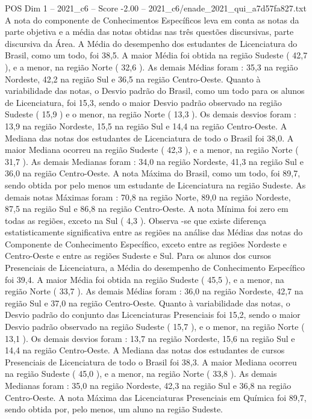 \begin{textsample}{POS Dim 1 – 2021\_c6 – Score -2.00 – 2021\_c6/enade\_2021\_qui\_a7d57fa827.txt}
A nota do componente de Conhecimentos Específicos leva em conta as notas da parte objetiva e a média das notas obtidas nas três questões discursivas, parte discursiva da Área.
A Média do desempenho dos estudantes de Licenciatura do Brasil, como um todo, foi 38,5.
A maior Média foi obtida na região Sudeste ( 42,7 ), e a menor, na região Norte ( 32,6 ).
As demais Médias foram : 35,3 na região Nordeste, 42,2 na região Sul e 36,5 na região Centro-Oeste.
Quanto à variabilidade das notas, o Desvio padrão do Brasil, como um todo para os alunos de Licenciatura, foi 15,3, sendo o maior Desvio padrão observado na região Sudeste ( 15,9 ) e o menor, na região Norte ( 13,3 ).
Os demais desvios foram : 13,9 na região Nordeste, 15,5 na região Sul e 14,4 na região Centro-Oeste.
A Mediana das notas dos estudantes de Licenciatura de todo o Brasil foi 38,0.
A maior Mediana ocorreu na região Sudeste ( 42,3 ), e a menor, na região Norte ( 31,7 ).
As demais Medianas foram : 34,0 na região Nordeste, 41,3 na região Sul e 36,0 na região Centro-Oeste.
A nota Máxima do Brasil, como um todo, foi 89,7, sendo obtida por pelo menos um estudante de Licenciatura na região Sudeste.
As demais notas Máximas foram : 70,8 na região Norte, 89,0 na região Nordeste, 87,5 na região Sul e 86,8 na região Centro-Oeste.
A nota Mínima foi zero em todas as regiões, exceto na Sul ( 4,3 ).
Observa -se que existe diferença estatisticamente significativa entre as regiões na análise das Médias das notas do Componente de Conhecimento Específico, exceto entre as regiões Nordeste e Centro-Oeste e entre as regiões Sudeste e Sul.
Para os alunos dos cursos Presenciais de Licenciatura, a Média do desempenho de Conhecimento Específico foi 39,4.
A maior Média foi obtida na região Sudeste ( 45,5 ), e a menor, na região Norte ( 33,7 ).
As demais Médias foram : 36,0 na região Nordeste, 42,7 na região Sul e 37,0 na região Centro-Oeste.
Quanto à variabilidade das notas, o Desvio padrão do conjunto das Licenciaturas Presenciais foi 15,2, sendo o maior Desvio padrão observado na região Sudeste ( 15,7 ), e o menor, na região Norte ( 13,1 ).
Os demais desvios foram : 13,7 na região Nordeste, 15,6 na região Sul e 14,4 na região Centro-Oeste.
A Mediana das notas dos estudantes de cursos Presenciais de Licenciatura de todo o Brasil foi 38,3.
A maior Mediana ocorreu na região Sudeste ( 45,0 ), e a menor, na região Norte ( 33,8 ).
As demais Medianas foram : 35,0 na região Nordeste, 42,3 na região Sul e 36,8 na região Centro-Oeste.
A nota Máxima das Licenciaturas Presenciais em Química foi 89,7, sendo obtida por, pelo menos, um aluno na região Sudeste.

\end{textsample}
